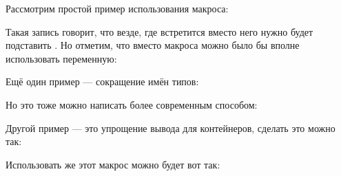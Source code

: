Рассмотрим простой пример использования макроса:


Такая запись говорит, что везде, где встретится  вместо него нужно будет подставить . Но отметим, что вместо макроса можно было бы вполне использовать переменную:


Ещё один пример — сокращение имён типов:


Но это тоже можно написать более современным способом:


Другой пример — это упрощение вывода для контейнеров, сделать это можно так:


Использовать же этот макрос можно будет вот так:


